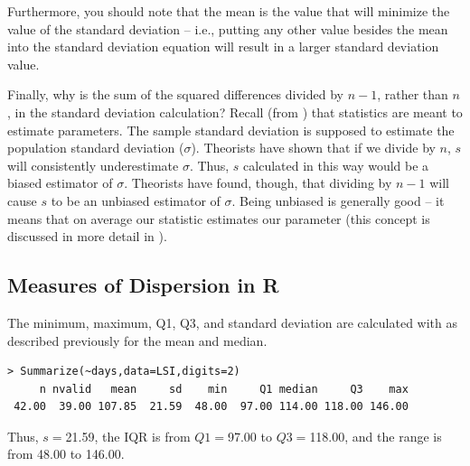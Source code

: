 \documentclass[10pt,openany]{book}\usepackage[]{graphicx}\usepackage[]{color}
\makeatletter
\newenvironment{kframe}{%
 \def\at@end@of@kframe{}%
 \ifinner\ifhmode%
  \def\at@end@of@kframe{\end{minipage}}%
  \begin{minipage}{\columnwidth}%
 \fi\fi%
 \def\FrameCommand##1{\hskip\@totalleftmargin \hskip-\fboxsep
 \colorbox{shadecolor}{##1}\hskip-\fboxsep
     \hskip-\linewidth \hskip-\@totalleftmargin \hskip\columnwidth}%
 \MakeFramed {\advance\hsize-\width
   \@totalleftmargin\z@ \linewidth\hsize
   \@setminipage}}%
 {\par\unskip\endMakeFramed%
 \at@end@of@kframe}
\newenvironment{knitrout}{}{} %
\makeatother
\begin{document}

Furthermore, you should note that the mean is the value that will minimize the value of the standard deviation -- i.e., putting any other value besides the mean into the standard deviation equation will result in a larger standard deviation value.

Finally, why is the sum of the squared differences divided by $n-1$, rather than $n$, in the standard deviation calculation?  Recall (from ) that statistics are meant to estimate parameters.  The sample standard deviation is supposed to estimate the population standard deviation ($\sigma$).  Theorists have shown that if we divide by $n$, $s$ will consistently underestimate $\sigma$.  Thus, $s$ calculated in this way would be a biased estimator of $\sigma$.  Theorists have found, though, that dividing by $n-1$ will cause $s$ to be an unbiased estimator of $\sigma$.  Being unbiased is generally good -- it means that on average our statistic estimates our parameter (this concept is discussed in more detail in ).

\vspace{-24pt}
\subsection{Measures of Dispersion in R} \label{sect:DescStatsDispersion}
\vspace{-12pt}
The minimum, maximum, Q1, Q3, and standard deviation are calculated with  as described previously for the mean and median.
\begin{knitrout}
\color{fgcolor}\begin{kframe}
\begin{verbatim}
> Summarize(~days,data=LSI,digits=2)
     n nvalid   mean     sd    min     Q1 median     Q3    max 
 42.00  39.00 107.85  21.59  48.00  97.00 114.00 118.00 146.00 
\end{verbatim}
\end{kframe}
\end{knitrout}

Thus, $s=$21.59, the IQR is from $Q1=$97.00 to $Q3=$118.00, and the range is from 48.00 to 146.00.
\end{document}
